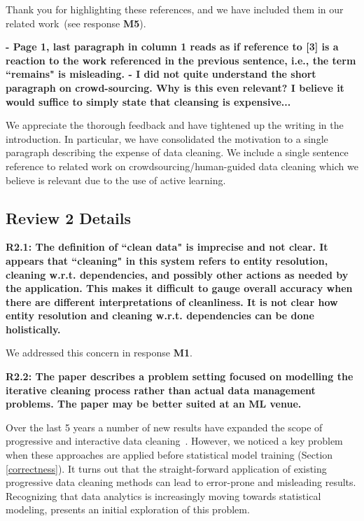 Thank you for highlighting these references, and we have included them in our related work~(see response \textbf{M5}).

\vspace{0.5em}

\noindent\textbf{- Page 1, last paragraph in column 1 reads as if reference to [3] is a reaction to the work referenced in the previous sentence, i.e., the term ``remains" is misleading.
- I did not quite understand the short paragraph on crowd-sourcing. Why is this even relevant?
 I believe it would suffice to simply state that cleansing is expensive...}

We appreciate the thorough feedback and have tightened up the writing in the introduction. In particular, we have consolidated the motivation to a single paragraph describing the expense of data cleaning. We include a single sentence reference to related work on crowdsourcing/human-guided data cleaning which we believe is relevant due to the use of active learning.


\subsection*{Review 2 Details}

\noindent\textbf{R2.1: The definition of ``clean data" is imprecise and not clear. It appears that ``cleaning" in this system refers to entity resolution, cleaning w.r.t. dependencies, and possibly other actions as needed by the application. This makes it difficult to gauge overall accuracy when there are different interpretations of cleanliness. It is not clear how entity resolution and cleaning w.r.t. dependencies can be done holistically.}

We addressed this concern in response \textbf{M1}.

\vspace{0.5em}

\noindent\textbf{R2.2: The paper describes a problem setting focused on modelling the iterative cleaning process rather than actual data management problems. The paper may be better suited at an ML venue.}

Over the last 5 years a number of new results have expanded the scope of progressive and interactive data cleaning~\cite{mayfield2010eracer, DBLP:journals/pvldb/YakoutENOI11, yakout2013don, altowim2014progressive, whang2014incremental, papenbrock2015progressive, gruenheid2014incremental}.
However, we noticed a key problem when these approaches are applied before statistical model training (Section \ref{correctness}).
It turns out that the straight-forward application of existing progressive data cleaning methods
can lead to error-prone and misleading results.
Recognizing that data analytics is increasingly moving towards statistical modeling, \sys presents an initial exploration of this problem.  

